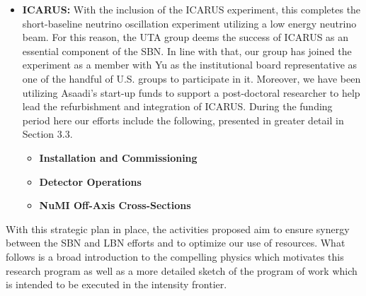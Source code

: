 \begin{itemize}
\begin{itemize}
\end{itemize}

\item{{\bf ICARUS:} With the inclusion of the ICARUS experiment, this completes the short-baseline neutrino oscillation experiment utilizing a low energy neutrino beam. For this reason, the UTA group deems the success of ICARUS as an essential component of the SBN. In line with that, our group has joined the experiment as a member with Yu as the institutional board representative as one of the handful of U.S. groups to participate in it. Moreover, we have been utilizing Asaadi's start-up funds to support a post-doctoral researcher to help lead the refurbishment and integration of ICARUS. During the funding period here our efforts include the following, presented in greater detail in Section 3.3.}

\begin{itemize}
\item{\textbf{Installation and Commissioning}}
\item{\textbf{Detector Operations}}
\item{\textbf{NuMI Off-Axis Cross-Sections}}

\end{itemize}

\end{itemize}

With this strategic plan in place, the activities proposed aim to ensure synergy between the SBN and LBN efforts and to optimize our use of resources. What follows is a broad introduction to the compelling physics which motivates this research program as well as a more detailed sketch of the program of work which is intended to be executed in the intensity frontier.

